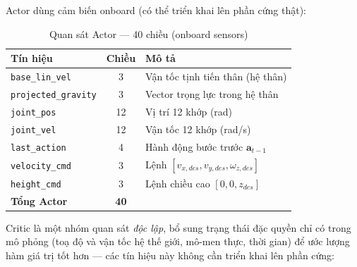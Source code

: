 Actor dùng cảm biến onboard (có thể triển khai lên phần cứng thật):

\begin{table}[H]
    \centering
    \caption{Quan sát Actor — 40 chiều (onboard sensors)}
    \label{tab:obs_actor}
    \renewcommand{\arraystretch}{1.3}
    \begin{tabular}{|l|c|l|}
    \hline
    \textbf{Tín hiệu} & \textbf{Chiều} & \textbf{Mô tả} \\
    \hline
    \texttt{base\_lin\_vel}      & 3  & Vận tốc tịnh tiến thân (hệ thân) \\
    \texttt{projected\_gravity}  & 3  & Vector trọng lực trong hệ thân \\
    \texttt{joint\_pos}          & 12 & Vị trí 12 khớp (rad) \\
    \texttt{joint\_vel}          & 12 & Vận tốc 12 khớp (rad/s) \\
    \texttt{last\_action}        & 4  & Hành động bước trước $\mathbf{a}_{t-1}$ \\
    \texttt{velocity\_cmd}       & 3  & Lệnh $[v_{x,des},v_{y,des},\omega_{z,des}]$ \\
    \texttt{height\_cmd}         & 3  & Lệnh chiều cao $[0,0,z_{des}]$ \\
    \hline
    \textbf{Tổng Actor}          & \textbf{40} & \\
    \hline
    \end{tabular}
\end{table}

Critic là một nhóm quan sát \emph{độc lập}, bổ sung trạng thái đặc quyền chỉ
có trong mô phỏng (toạ độ và vận tốc hệ thế giới, mô-men thực, thời gian) để
ước lượng hàm giá trị tốt hơn — các tín hiệu này không cần triển khai lên
phần cứng:

